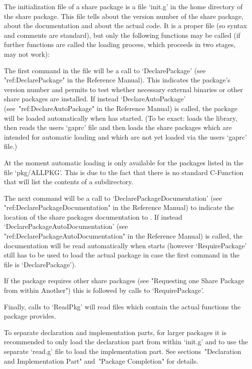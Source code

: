 
The initialization file of a share package is a file `init.g' in the
home directory of the share package. This file tells {\GAP} about the
version number of the share package, about the documentation and about
the actual code. It is a proper {\GAP} file (so syntax and comments
are standard), but only the following {\GAP} functions may be called
(if further functions are called the loading process, which proceeds
in two stages, may not work):

The first command in the file will be a call to `DeclarePackage' (see
"ref:DeclarePackage" in the Reference Manual). This indicates the package's
version number and permits to test whether necessary external binaries or
other share packages are installed. If instead `DeclareAutoPackage'
(see~"ref:DeclareAutoPackage" in the Reference Manual) is called, the
package will be loaded automatically when {\GAP} has started. (To be exact:
{\GAP} loads the library, then reads the users `gaprc' file and then loads
the share packages which are intended for automatic loading and which are
not yet loaded via the users `gaprc' file.)

At the moment automatic loading is only available for the packages listed
in the file `pkg/ALLPKG'. This is due to the fact that there is no standard
C-Function that will list the contents of a subdirectory.

The next command will be a call to `DeclarePackageDocumentation' (see
"ref:DeclarePackageDocumentation" in the Reference Manual) to indicate the
location of the share packages documentation to {\GAP}. If instead
`DeclarePackageAutoDocumentation' (see "ref:DeclarePackageAutoDocumentation"
in the Reference Manual) is called, the documentation will be read
automatically when {\GAP} starts (however `RequirePackage' still has to be
used to load the actual package in case the first command in the file is
`DeclarePackage').

If the package requires other share packages (see "Requesting one Share
Package from within Another") this is followed by calls to `RequirePackage'.

Finally, calls to `ReadPkg' will read files which contain the actual {\GAP}
functions the package provides.

To separate declaration and implementation parts, for larger packages it is
recommended to only load the declaration part from within `init.g' and to
use the separate `read.g' file to load the implementation part.
See sections~"Declaration and Implementation Part" and~"Package Completion"
for details.

